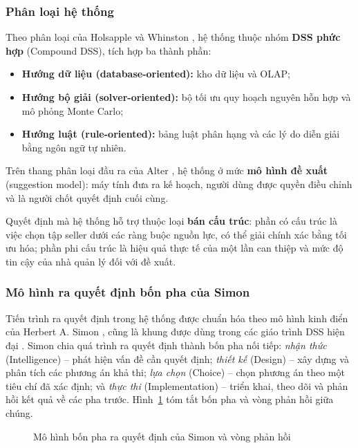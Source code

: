 \subsubsection*{Phân loại hệ thống}
Theo phân loại của Holsapple và Whinston \cite{holsapple1996}, hệ thống thuộc nhóm \textbf{DSS phức hợp} (Compound DSS), tích hợp ba thành phần:
\begin{itemize}
    \item \textbf{Hướng dữ liệu (database-oriented):} kho dữ liệu và OLAP;
    \item \textbf{Hướng bộ giải (solver-oriented):} bộ tối ưu quy hoạch nguyên hỗn hợp và mô phỏng Monte Carlo;
    \item \textbf{Hướng luật (rule-oriented):} bảng luật phân hạng và các lý do diễn giải bằng ngôn ngữ tự nhiên.
\end{itemize}
Trên thang phân loại đầu ra của Alter \cite{alter1980}, hệ thống ở mức \textbf{mô hình đề xuất} (suggestion model): máy tính đưa ra kế hoạch, người dùng được quyền điều chỉnh và là người chốt quyết định cuối cùng.

Quyết định mà hệ thống hỗ trợ thuộc loại \textbf{bán cấu trúc}: phần có cấu trúc là việc chọn tập seller dưới các ràng buộc nguồn lực, có thể giải chính xác bằng tối ưu hóa; phần phi cấu trúc là hiệu quả thực tế của một lần can thiệp và mức độ tin cậy của nhà quản lý đối với đề xuất.

\subsubsection*{Mô hình ra quyết định bốn pha của Simon}
Tiến trình ra quyết định trong hệ thống được chuẩn hóa theo mô hình kinh điển của Herbert A. Simon \cite{simon1960}, cũng là khung được dùng trong các giáo trình DSS hiện đại \cite{turban2020}. Simon chia quá trình ra quyết định thành bốn pha nối tiếp: \emph{nhận thức} (Intelligence) -- phát hiện vấn đề cần quyết định; \emph{thiết kế} (Design) -- xây dựng và phân tích các phương án khả thi; \emph{lựa chọn} (Choice) -- chọn phương án theo một tiêu chí đã xác định; và \emph{thực thi} (Implementation) -- triển khai, theo dõi và phản hồi kết quả về các pha trước. Hình~\ref{fig:simon} tóm tắt bốn pha và vòng phản hồi giữa chúng.

\begin{figure}[htbp]
\centering
\resizebox{\textwidth}{!}{}
\caption{Mô hình bốn pha ra quyết định của Simon và vòng phản hồi}
\label{fig:simon}
\end{figure}

